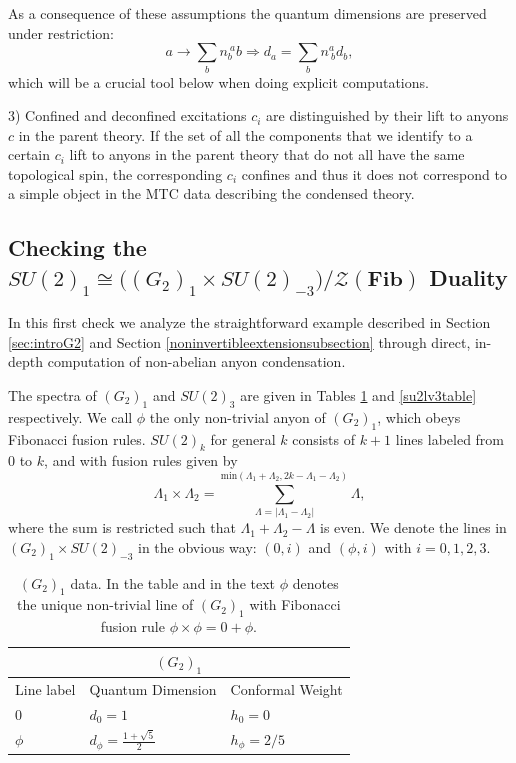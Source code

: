 \documentclass[11pt]{article}
\numberwithin{equation}{section}
\begin{document}
As a consequence of these assumptions the quantum dimensions are preserved under restriction:
\begin{equation}
    a \longrightarrow \sum_{b} n_{b}^{\ a}b \Longrightarrow d_{a} = \sum_{b} n_{\ b}^{a}d_{b},
\end{equation} 
which will be a crucial tool below when doing explicit computations. 

3) Confined and deconfined excitations $c_{i}$ are distinguished by their lift to anyons $c$ in the parent theory. If the set of all the components that we identify to a certain $c_{i}$ lift to anyons in the parent theory that do not all have the same topological spin, the corresponding $c_{i}$ confines and thus it does not correspond to a simple object in the MTC data describing the condensed theory.







\subsection{Checking the $SU(2)_{1} \cong \big( (G_{2})_{1} \times SU(2)_{-3} \big)/\mathcal{Z}(\mathbf{Fib})$ Duality}  \label{IntroductionExample}

In this first check we analyze the straightforward example described in Section \ref{sec:introG2} and Section \ref{noninvertibleextensionsubsection} through direct, in-depth computation of non-abelian anyon condensation.


The spectra of $(G_{2})_{1}$ and $SU(2)_{3}$ are given in Tables \ref{g2lv1table} and \ref{su2lv3table} respectively. We call $\phi$ the only non-trivial anyon of $(G_{2})_{1}$, which obeys Fibonacci fusion rules. $SU(2)_{k}$ for general $k$ consists of $k+1$ lines labeled from $0$ to $k$, and with fusion rules given by
\begin{equation}
    \Lambda_{1} \times \Lambda_{2} = \sum_{\Lambda = |\Lambda_{1}-\Lambda_{2}|}^{\mathrm{min}(\Lambda_{1}+\Lambda_{2},2k-\Lambda_{1}-\Lambda_{2})}  \Lambda, \label{SU2kFusionRules}
\end{equation}
where the sum is restricted such that $\Lambda_{1} + \Lambda_{2} - \Lambda$ is even. We denote the lines in $(G_{2})_{1} \times SU(2)_{-3}$ in the obvious way: $(0,i)$ and $(\phi,i)$ with $i=0,1,2,3$.

\begin{table}[t]
\centering
\begin{tabular}[h]{|p{4cm}|p{4cm}|p{4cm}| }
\hline 
\multicolumn{3}{|c|}{$(G_{2})_{1}$} \\
\hline
Line label & Quantum Dimension & Conformal Weight \\
\hline
0 & $d_{0} = 1$ & $h_{0}=0$ \\
$\phi$ & $d_{\phi} = \frac{1+\sqrt{5}}{2}$ & $h_{\phi}=2/5$ \\
\hline
\end{tabular}
\caption{$(G_{2})_{1}$ data. In the table and in the text $\phi$ denotes the unique non-trivial line of $(G_{2})_{1}$ with Fibonacci fusion rule $\phi \times \phi = 0 + \phi$.}  \label{g2lv1table}
\end{table}
\end{document}
